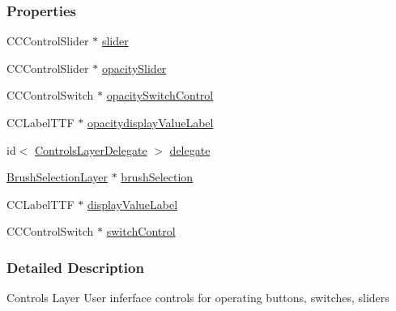\subsubsection*{Properties}
\begin{DoxyCompactItemize}
\item 
C\-C\-Control\-Slider $\ast$ \hyperlink{interface_controls_layer_a599701380c37caf4e656efaa860469a3}{slider}
\item 
C\-C\-Control\-Slider $\ast$ \hyperlink{interface_controls_layer_aff48213936f8ff3b2aa2f44d5125fc6f}{opacity\-Slider}
\item 
C\-C\-Control\-Switch $\ast$ \hyperlink{interface_controls_layer_ad2bbac273b79a99c46e66c61ea66c88b}{opacity\-Switch\-Control}
\item 
C\-C\-Label\-T\-T\-F $\ast$ \hyperlink{interface_controls_layer_a1a60fd6edd83a2789b575845390a44be}{opacitydisplay\-Value\-Label}
\item 
id$<$ \hyperlink{protocol_controls_layer_delegate-p}{Controls\-Layer\-Delegate} $>$ \hyperlink{interface_controls_layer_aebfe5471226d1bc0afef5d662219f913}{delegate}
\item 
\hyperlink{interface_brush_selection_layer}{Brush\-Selection\-Layer} $\ast$ \hyperlink{interface_controls_layer_a56c514c5fde8025a9de19c4b8225478b}{brush\-Selection}
\item 
C\-C\-Label\-T\-T\-F $\ast$ \hyperlink{interface_controls_layer_ab9f12f7a90a0bf6ae1abaeb4d4c4e378}{display\-Value\-Label}
\item 
C\-C\-Control\-Switch $\ast$ \hyperlink{interface_controls_layer_a8997cfae8a4f6bcfb8c53d8cab6bb480}{switch\-Control}
\end{DoxyCompactItemize}


\subsubsection{Detailed Description}
Controls Layer User inferface controls for operating buttons, switches, sliders 

